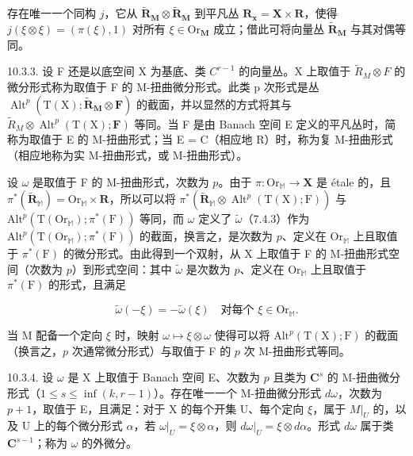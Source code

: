 存在唯一一个同构 \(j\)，它从 \(\tilde{\mathbf{R}}_{\mathbf{M}} \otimes \tilde{\mathbf{R}}_{\mathbf{M}}\) 到平凡丛 \(\mathbf{R}_{\mathbf{x}} = \mathbf{X} \times \mathbf{R}\)，使得 \(j(\xi \otimes \xi) = (\pi(\xi), 1)\) 对所有 \(\xi \in \mathrm{Or}_{\mathbf{M}}\) 成立；借此可将向量丛 \(\tilde{\mathbf{R}}_{\mathbf{M}}\) 与其对偶等同。

10.3.3. 设 F 还是以底空间 X 为基底、类 \(C^{r-1}\) 的向量丛。X 上取值于 \(\tilde{R}_{M} \otimes F\) 的微分形式称为取值于 F 的 M-扭曲微分形式。此类 p 次形式是丛 \(\operatorname{Alt}^{p}(\mathrm{T}(\mathrm{X}); \tilde{\mathbf{R}}_{\mathbf{M}} \otimes \mathbf{F})\) 的截面，并以显然的方式将其与 \(\tilde{R}_{M} \otimes \operatorname{Alt}^{p}(\mathrm{T}(\mathrm{X}); \mathbf{F})\) 等同。当 F 是由 Banach 空间 E 定义的平凡丛时，简称为取值于 E 的 M-扭曲形式；当 E = C（相应地 R）时，称为复 M-扭曲形式（相应地称为实 M-扭曲形式，或 M-扭曲形式）。

设 \(\omega\) 是取值于 F 的 M-扭曲形式，次数为 \(p\)。由于 \(\pi\colon\mathrm{Or}_{\mathbb{M}}\to\mathbf{X}\) 是 étale 的，且 \(\pi^{*}(\tilde{\mathbf{R}}_{\mathbb{M}})=\mathrm{Or}_{\mathbb{M}}\times\mathbf{R}\)，所以可以将 \(\pi^{*}(\tilde{\mathbf{R}}_{\mathbb{M}}\otimes\operatorname{Alt}^{p}(\mathrm{T}(\mathrm{X});\mathrm{F}))\) 与 \(\mathrm{Alt}^{p}(\mathrm{T}(\mathrm{Or}_{\mathbb{M}});\pi^{*}(\mathrm{F}))\) 等同，而 \(\omega\) 定义了 \(\tilde{\omega}\)（7.4.3）作为 \(\mathrm{Alt}^{p}(\mathrm{T}(\mathrm{Or}_{\mathbb{M}});\pi^{*}(\mathrm{F}))\) 的截面，换言之，是次数为 \(p\)、定义在 \(\mathrm{Or}_{\mathbb{M}}\) 上且取值于 \(\pi^{*}(\mathrm{F})\) 的微分形式。由此得到一个双射，从 X 上取值于 F 的 M-扭曲形式空间（次数为 \(p\)）到形式空间：其中 \(\tilde{\omega}\) 是次数为 \(p\)、定义在 \(\mathrm{Or}_{\mathbb{M}}\) 上且取值于 \(\pi^{*}(\mathrm{F})\) 的形式，且满足

\[
\tilde{\omega}(-\xi)=-\tilde{\omega}(\xi)\quad\text{对每个 }\xi\in\mathrm{Or}_{\mathbb{M}}.
\]

当 M 配备一个定向 \(\xi\) 时，映射 \(\omega \mapsto \xi \otimes \omega\) 使得可以将 \(\mathrm{Alt}^p(\mathrm{T}(\mathrm{X});\mathrm{F})\) 的截面（换言之，\(p\) 次通常微分形式）与取值于 F 的 \(p\) 次 M-扭曲形式等同。

10.3.4. 设 \(\omega\) 是 X 上取值于 Banach 空间 E、次数为 \(p\) 且类为 \(\mathbf{C}^s\) 的 M-扭曲微分形式（\(1 \leqslant s \leqslant \inf(k, r - 1)\)）。存在唯一一个 M-扭曲微分形式 \(d\omega\)，次数为 \(p + 1\)，取值于 E，且满足：对于 X 的每个开集 U、每个定向 \(\xi\)，属于 \(M|_{U}\) 的，以及 U 上的每个微分形式 \(\alpha\)，若 \(\omega|_{U} = \xi \otimes \alpha\)，则 \(d\omega|_{U} = \xi \otimes d\alpha\)。形式 \(d\omega\) 属于类 \(\mathbf{C}^{s-1}\)；称为 \(\omega\) 的外微分。

